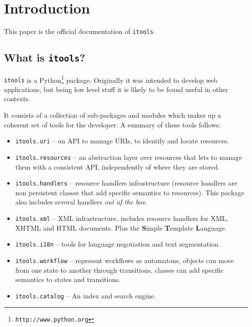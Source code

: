 \chapter{Introduction}

This paper is the official documentation of {\tt itools}.

\section{What is {\tt itools}?}

{\tt itools} is a Python\footnote{\tt http://www.python.org} package.
Originally it was intended to develop web applications, but being low
level stuff it is likely to be found useful in other contexts.

It consists of a collection of sub-packages and modules which makes up a
coherent set of tools for the developer. A summary of these tools follows:

\begin{itemize}
 \item {\tt itools.uri} -- an API to manage URIs, to identify and locate
    resources.

 \item {\tt itools.resources} -- an abstraction layer over resources that
   lets to manage them with a consistent API, independently of where they
   are stored.

 \item {\tt itools.handlers} -- resource handlers infrastructure (resource
   handlers are non persistent classes that add specific semantics to
   resources). This package also includes several handlers {\em out of the
   box}.

 \item {\tt itools.xml} -- XML infrastructure, includes resource handlers
   for XML, XHTML and HTML documents. Plus the {\bf S}imple {\bf T}emplate
   {\bf L}anguage.

 \item {\tt itools.i18n} -- tools for language negotiation and text
   segmentation.

 \item {\tt itools.workflow} -- represent workflows as automatons, objects
   can move from one state to another through transitions, classes can add
   specific semantics to states and transitions.

 \item {\tt itools.catalog} -- An index and search engine.
\end{itemize}

